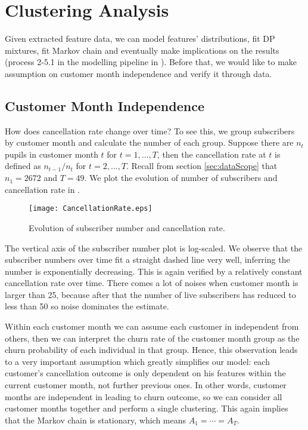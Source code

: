 \section{Clustering Analysis}
\label{sec:clustering}

Given extracted feature data, we can model features' distributions, fit DP mixtures, fit Markov chain and eventually make implications on the results (process 2-5.1 in the modelling pipeline in ). Before that, we would like to make assumption on customer month independence and verify it through data.

\subsection{Customer Month Independence}

How does cancellation rate change over time? To see this, we group subscribers by customer month and calculate the number of each group. Suppose there are $n_t$ pupils in customer month $t$ for $t=1,\dots,T$, then the cancellation rate at $t$ is defined as $n_{t-1} / n_t$ for $t=2,\dots, T$. Recall from section \ref{sec:dataScope} that $n_1 = 2672$ and $T = 49$. We plot the evolution of number of subscribers and cancellation rate in .

\begin{figure}[!h]
\centering
\texttt{[image: CancellationRate.eps]}
\caption{Evolution of subscriber number and cancellation rate.}
\label{fig:cancellationRate}
\end{figure}

The vertical axis of the subscriber number plot is log-scaled. We observe that the subscriber numbers over time fit a straight dashed line very well, inferring the number is exponentially decreasing. This is again verified by a relatively constant cancellation rate over time. There comes a lot of noises when customer month is larger than 25, because after that the number of live subscribers has reduced to less than 50 so noise dominates the estimate.

Within each customer month we can assume each customer in independent from others, then we can interpret the churn rate of the customer month group as the churn probability of each individual in that group. Hence, this observation leads to a very important assumption which greatly simplifies our model: each customer's cancellation outcome is only dependent on his features within the current customer month, not further previous ones. In other words, customer months are independent in leading to churn outcome, so we can consider all customer months together and perform a single clustering. This again implies that the Markov chain is stationary, which means $A_1 = \cdots = A_T$.

